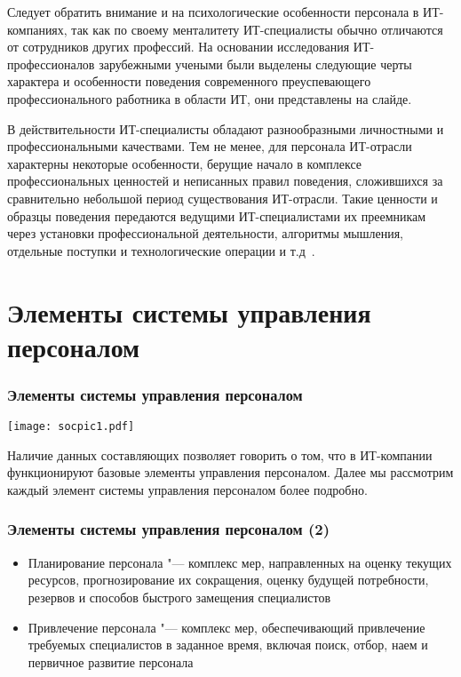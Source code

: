 \documentclass{../industrial-development}
\begin{document}
Следует обратить внимание и на психологические особенности персонала в ИТ-компаниях, так как по своему менталитету ИТ-специалисты обычно отличаются от сотрудников других профессий. На основании исследования ИТ-профессионалов зарубежными учеными были выделены следующие черты характера и особенности поведения современного преуспевающего профессионального работника в области ИТ, они представлены на слайде.

В действительности ИТ-специалисты обладают разнообразными личностными и профессиональными качествами. Тем не менее, для персонала ИТ-отрасли характерны некоторые особенности, берущие начало в комплексе профессиональных ценностей и неписанных правил поведения, сложившихся за сравнительно небольшой период существования ИТ-отрасли. Такие ценности и образцы поведения передаются ведущими ИТ-специалистами их преемникам через установки профессиональной деятельности, алгоритмы мышления, отдельные поступки и технологические операции и т.д~\cite{OsobenPoveden}. 

\section{Элементы системы управления персоналом}
\begin{frame} \frametitle{Элементы системы управления персоналом}
	
	\centerline{\texttt{[image: socpic1.pdf]}}
	
\end{frame}

\lecturenotes

Наличие данных составляющих позволяет говорить о том, что в ИТ-компании функционируют базовые элементы управления персоналом. Далее мы рассмотрим каждый элемент системы управления персоналом более подробно.

\begin{frame} \frametitle{Элементы системы управления персоналом (2)}
	
	\begin{itemize}
		\item Планирование персонала "--- комплекс мер, направленных на оценку текущих ресурсов, прогнозирование их сокращения, оценку будущей потребности, резервов и способов быстрого замещения специалистов
		\item Привлечение персонала "--- комплекс мер, обеспечивающий привлечение требуемых специалистов в заданное время, включая поиск, отбор, наем и первичное развитие персонала
	\end{itemize}
\end{frame}
\end{document}
